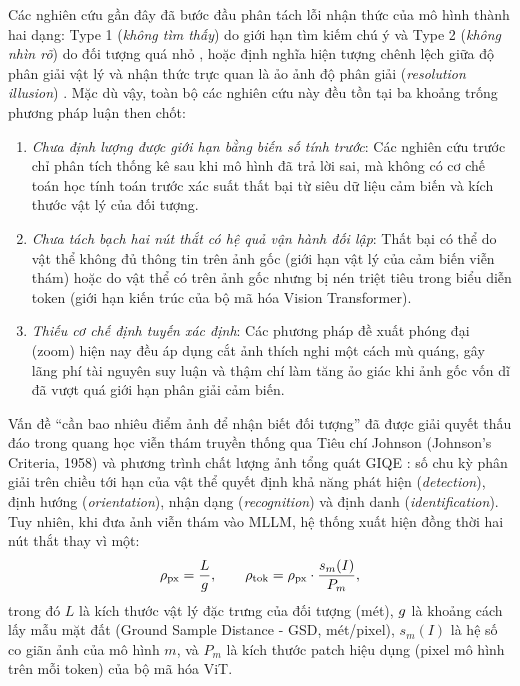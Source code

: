 Các nghiên cứu gần đây đã bước đầu phân tách lỗi nhận thức của mô hình thành hai dạng: Type 1 (\textit{không tìm thấy}) do giới hạn tìm kiếm chú ý và Type 2 (\textit{không nhìn rõ}) do đối tượng quá nhỏ \cite{radar2024}, hoặc định nghĩa hiện tượng chênh lệch giữa độ phân giải vật lý và nhận thức trực quan là ảo ảnh độ phân giải (\textit{resolution illusion}) \cite{uhrmicro2024}. Mặc dù vậy, toàn bộ các nghiên cứu này đều tồn tại ba khoảng trống phương pháp luận then chốt:
\begin{enumerate}
    \item \textit{Chưa định lượng được giới hạn bằng biến số tính trước}: Các nghiên cứu trước chỉ phân tích thống kê sau khi mô hình đã trả lời sai, mà không có cơ chế toán học tính toán trước xác suất thất bại từ siêu dữ liệu cảm biến và kích thước vật lý của đối tượng.
    \item \textit{Chưa tách bạch hai nút thắt có hệ quả vận hành đối lập}: Thất bại có thể do vật thể không đủ thông tin trên ảnh gốc (giới hạn vật lý của cảm biến viễn thám) hoặc do vật thể có trên ảnh gốc nhưng bị nén triệt tiêu trong biểu diễn token (giới hạn kiến trúc của bộ mã hóa Vision Transformer).
    \item \textit{Thiếu cơ chế định tuyến xác định}: Các phương pháp đề xuất phóng đại (zoom) hiện nay \cite{radar2024, uhrmicro2024} đều áp dụng cắt ảnh thích nghi một cách mù quáng, gây lãng phí tài nguyên suy luận và thậm chí làm tăng ảo giác khi ảnh gốc vốn dĩ đã vượt quá giới hạn phân giải cảm biến.
\end{enumerate}

Vấn đề ``cần bao nhiêu điểm ảnh để nhận biết đối tượng'' đã được giải quyết thấu đáo trong quang học viễn thám truyền thống qua Tiêu chí Johnson (Johnson's Criteria, 1958) \cite{johnson1958analysis} và phương trình chất lượng ảnh tổng quát GIQE \cite{leachtenauer1997general}: số chu kỳ phân giải trên chiều tới hạn của vật thể quyết định khả năng phát hiện (\textit{detection}), định hướng (\textit{orientation}), nhận dạng (\textit{recognition}) và định danh (\textit{identification}). Tuy nhiên, khi đưa ảnh viễn thám vào MLLM, hệ thống xuất hiện đồng thời hai nút thắt thay vì một:
\begin{equation}
\rho_{\mathrm{px}} = \frac{L}{g}, \qquad \rho_{\mathrm{tok}} = \rho_{\mathrm{px}} \cdot \frac{s_m(I)}{P_m},
\label{eq:footprints}
\end{equation}
trong đó $L$ là kích thước vật lý đặc trưng của đối tượng (mét), $g$ là khoảng cách lấy mẫu mặt đất (Ground Sample Distance - GSD, mét/pixel), $s_m(I)$ là hệ số co giãn ảnh của mô hình $m$, và $P_m$ là kích thước patch hiệu dụng (pixel mô hình trên mỗi token) của bộ mã hóa ViT.

